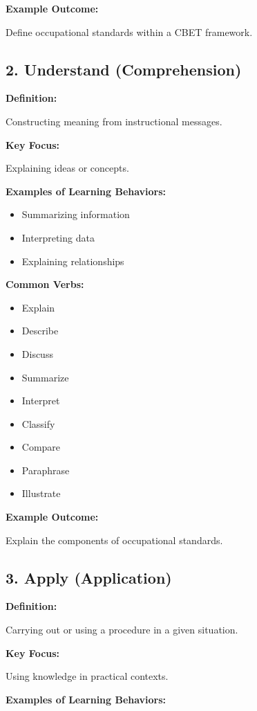 \documentclass[12pt]{article}
\begin{document}
\textbf{Example Outcome:}

Define occupational standards within a CBET framework.

\subsection{2. Understand (Comprehension)}

\textbf{Definition:}

Constructing meaning from instructional messages.

\textbf{Key Focus:}

Explaining ideas or concepts.

\textbf{Examples of Learning Behaviors:}

\begin{itemize}
    \item Summarizing information
    \item Interpreting data
    \item Explaining relationships
\end{itemize}

\textbf{Common Verbs:}

\begin{itemize}
    \item Explain
    \item Describe
    \item Discuss
    \item Summarize
    \item Interpret
    \item Classify
    \item Compare
    \item Paraphrase
    \item Illustrate
\end{itemize}

\textbf{Example Outcome:}

Explain the components of occupational standards.

\subsection{3. Apply (Application)}

\textbf{Definition:}

Carrying out or using a procedure in a given situation.

\textbf{Key Focus:}

Using knowledge in practical contexts.

\textbf{Examples of Learning Behaviors:}
\end{document}
